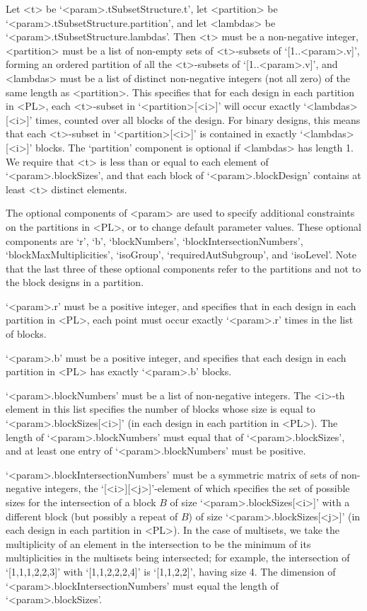 Let <t> be `<param>.tSubsetStructure.t', let <partition> be
`<param>.tSubsetStructure.partition', and let <lambdas> be
`<param>.tSubsetStructure.lambdas'.  Then <t> must be a non-negative
integer, <partition> must be a list of non-empty sets of <t>-subsets of
`[1..<param>.v]', forming an ordered partition of all the <t>-subsets of
`[1..<param>.v]', and <lambdas> must be a list of distinct non-negative
integers (not all zero) of the same length as <partition>. This specifies
that for each design in each partition in <PL>, each <t>-subset in
`<partition>[<i>]' will occur exactly `<lambdas>[<i>]' times, counted
over all blocks of the design.  For binary designs, this means that each
<t>-subset in `<partition>[<i>]' is contained in exactly `<lambdas>[<i>]'
blocks.  The `partition' component is optional if <lambdas> has length 1.
We require that <t> is less than or equal to each element of
`<param>.blockSizes', and that each block of `<param>.blockDesign'
contains at least <t> distinct elements.

The optional components of <param> are used to specify additional
constraints on the partitions in <PL>, or to change default parameter
values. These optional components are `r', `b', `blockNumbers',
`blockIntersectionNumbers', `blockMaxMultiplicities', `isoGroup',
`requiredAutSubgroup', and `isoLevel'. Note that the last three of these
optional components refer to the partitions and not to the block designs
in a partition.

`<param>.r' must be a positive integer, and specifies that in each design
in each partition in <PL>, each point must occur exactly `<param>.r'
times in the list of blocks.

`<param>.b' must be a positive integer, and specifies that each design
in each partition in <PL> has exactly `<param>.b' blocks.

`<param>.blockNumbers' must be a list of non-negative integers. The <i>-th
element in this list specifies the number of blocks whose size is equal to
`<param>.blockSizes[<i>]' (in each design in each partition in <PL>). The
length of `<param>.blockNumbers' must equal that of `<param>.blockSizes',
and at least one entry of `<param>.blockNumbers' must be positive.

`<param>.blockIntersectionNumbers' must be a symmetric matrix of sets
of non-negative integers, the `[<i>][<j>]'-element of which specifies
the set of possible sizes for the intersection of a block $B$ of size
`<param>.blockSizes[<i>]' with a different block (but possibly a repeat of
$B$) of size `<param>.blockSizes[<j>]' (in each design in each partition
in <PL>). In the case of multisets, we take the multiplicity of an
element in the intersection to be the minimum of its multiplicities in
the multisets being intersected; for example, the intersection of
`[1,1,1,2,2,3]' with `[1,1,2,2,2,4]' is `[1,1,2,2]', having size 4.
The dimension of `<param>.blockIntersectionNumbers' must equal the length
of `<param>.blockSizes'.


